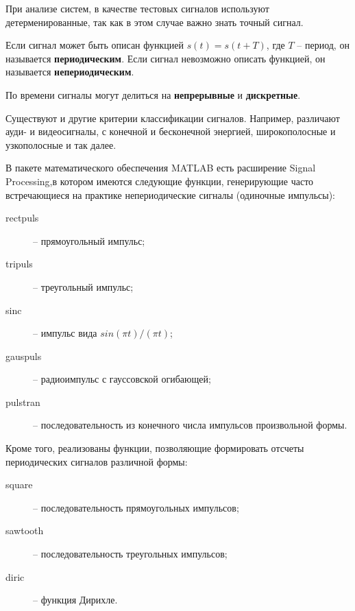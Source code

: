 \documentclass[12pt,a4paper]{article}
\begin{document}
При анализе систем, в качестве тестовых сигналов используют детерменированные, так как в этом случае важно знать точный сигнал.

Если сигнал может быть описан функцией $s(t)=s(t+T)$, где $T$ -- период, он называется \textbf{периодическим}. Если сигнал невозможно описать функцией, он называется \textbf{непериодическим}.

По времени сигналы могут делиться на \textbf{непрерывные} и \textbf{дискретные}.

Существуют и другие критерии классификации сигналов. Например, различают ауди- и видеосигналы, с конечной и бесконечной энергией, широкополосные и узкополосные и так далее.

В пакете математического обеспечения MATLAB есть расширение Signal Processing,в котором имеются следующие функции, генерирующие часто встречающиеся на практике непериодические сигналы (одиночные импульсы):
\begin{description}
\item[rectpuls] -- прямоугольный импульс;
\item[tripuls] -- треугольный импульс;
\item[sinc] -- импульс вида $sin(\pi t)/(\pi t)$;
\item[gauspuls] -- радиоимпульс с гауссовской огибающей;
\item[pulstran] -- последовательность из конечного числа импульсов произвольной формы.
\end{description}

Кроме того, реализованы функции, позволяющие формировать отсчеты периодических сигналов различной формы:
\begin{description}
\item[square] -- последовательность прямоугольных импульсов;
\item[sawtooth] -- последовательность треугольных импульсов;
\item[diric] -- функция Дирихле.
\end{description}
\end{document}
